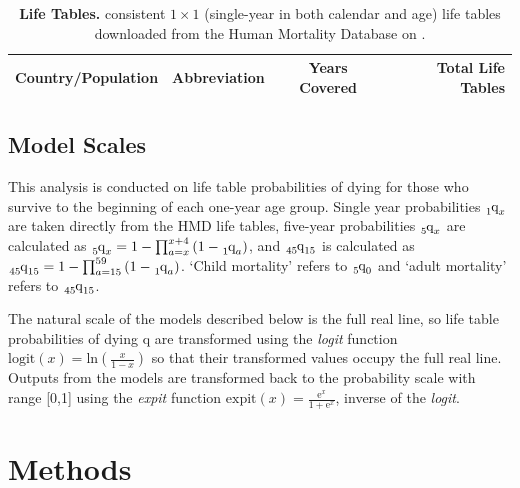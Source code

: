 \documentclass[11pt]{article}
\newcommand{\qf}{\tensor*[_5]{\mbox{q}}{_0}}
\newcommand{\qff}{\tensor*[_{45}]{\mbox{q}}{_{15}}}
\newcommand{\qox}{\tensor*[_{1}]{\mbox{q}}{_{x}}}
\newcommand{\qoa}{\tensor*[_{1}]{\mbox{q}}{_{a}}}
\newcommand{\qfx}{\tensor*[_{5}]{\mbox{q}}{_{x}}}
\newcommand{\logit}{\mbox{logit}}
\newcommand{\expit}{\mbox{expit}}
\DeclareRobustCommand{\LTtot}{}
\DeclareRobustCommand{\HMDdate}{ \begingroup\endlinechar=-1 \endgroup}
\begin{document}
\renewcommand{\arraystretch}{0.96}
\begin{table}[htp!]
\captionsetup{format=plain,font=normalsize,margin=1cm,justification=justified}
\caption{\textbf{Life Tables.} \LTtot consistent $1 \times 1$ (single-year in both calendar and age) life tables downloaded from the Human Mortality Database on \HMDdate.}
\begin{center}
\footnotesize
\begin{tabular}{ l l c r}

\toprule
Country/Population  & Abbreviation & Years Covered & Total Life Tables \\
\midrule

\bottomrule
\end{tabular}
\normalsize

\end{center}
\label{tab:hmdData}
\end{table}%
\renewcommand{\arraystretch}{1}

\subsection{Model Scales}

This analysis is conducted on life table probabilities of dying for those who survive to the beginning of each one-year age group.  Single year probabilities $\qox$ are taken directly from the HMD life tables, five-year probabilities $\qfx$ are calculated as $\qfx = 1 - \prod_{a=x}^{x+4}{(1-\qoa)}$, and $\qff$ is calculated as $\qff = 1 - \prod_{a=15}^{59}{(1-\qoa)}$.  `Child mortality' refers to $\qf$ and `adult mortality' refers to $\qff$.  

The natural scale of the models described below is the full real line, so life table probabilities of dying q are transformed using the \textit{logit} function $\logit(x) = \mbox{ln}\left(\frac{x}{1-x}\right)$ so that their transformed values occupy the full real line.   Outputs from the models are transformed back to the probability scale with range [0,1] using the \textit{expit} function $\expit(x) = \frac{\mbox{e}^x}{1+\mbox{e}^x}$, inverse of the \textit{logit}.


\section{Methods}
\end{document}
